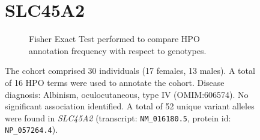 

\begin{figure}[htbp]
    \section*{SLC45A2}
\centering
\begin{subfigure}[b]{0.95\textwidth}
\centering
{}
\captionsetup{justification=raggedright,singlelinecheck=false}
\caption{Fisher Exact Test performed to compare HPO annotation frequency with respect to genotypes. }
\end{subfigure}

\vspace{2em}

\caption{ The cohort comprised 30 individuals (17 females, 13 males). A total of 16 HPO terms were used to annotate the cohort. Disease diagnosis: Albinism, oculocutaneous, type IV (OMIM:606574). No significant association identified. A total of 52 unique variant alleles were found in \textit{SLC45A2} (transcript: \texttt{NM\_016180.5}, protein id: \texttt{NP\_057264.4}).}
\end{figure}

